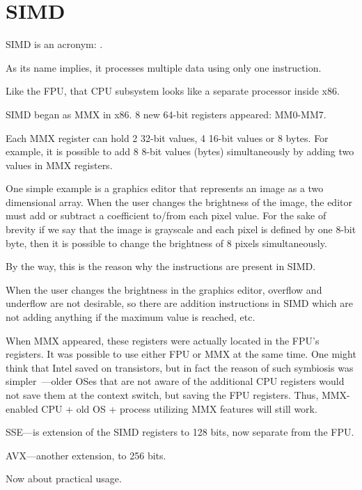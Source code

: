 \section{SIMD}

\label{SIMD_x86}
\ac{SIMD} is an acronym: .

As its name implies, it processes multiple data using only one instruction.

Like the \ac{FPU}, that \ac{CPU} subsystem looks like a separate processor inside x86.


SIMD began as MMX in x86. 8 new 64-bit registers appeared: MM0-MM7.

Each MMX register can hold 2 32-bit values, 4 16-bit values or 8 bytes.
For example, it is possible to add 8 8-bit values (bytes) simultaneously by adding two values in MMX registers.

One simple example is a graphics editor that represents an image as a two dimensional array.
When the user changes the brightness of the image, the editor must add or subtract a coefficient to/from each pixel value.
For the sake of brevity if we say that the image is grayscale and each pixel is defined by one 8-bit byte, then it is possible
to change the brightness of 8 pixels simultaneously.

By the way, this is the reason why the  instructions are present in SIMD.

When the user changes the brightness in the graphics editor, overflow and underflow are not desirable, 
so there are addition instructions in SIMD which are not adding anything if the maximum value is reached, etc.

When MMX appeared, these registers were actually located in the FPU's registers. 
It was possible to use either FPU or MMX at the same time. One might think that Intel saved on transistors,
but in fact the reason of such symbiosis was simpler~---older \ac{OS}es that are not aware 
of the additional CPU registers would not save them at the context switch, 
but saving the FPU registers.
Thus, MMX-enabled CPU + old \ac{OS} + process utilizing MMX features will still work.

SSE---is extension of the SIMD registers to 128 bits, now separate from the FPU.

AVX---another extension, to 256 bits.

Now about practical usage.

